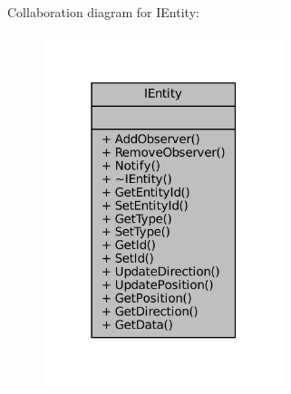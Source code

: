 Collaboration diagram for I\+Entity\+:\nopagebreak
\begin{figure}[H]
\begin{center}
\leavevmode
\includegraphics[width=199pt]{classIEntity__coll__graph}
\end{center}
\end{figure}
